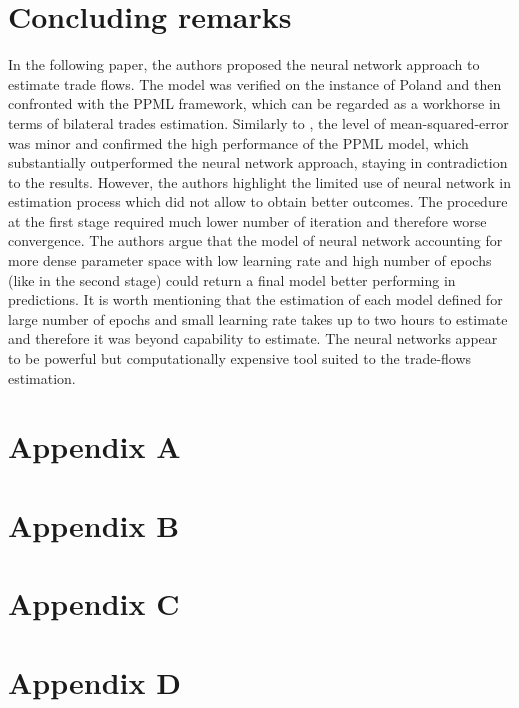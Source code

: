 \documentclass{Trade_template}
\numberwithin{equation}{section}
\begin{document}
\chapter{Concluding remarks} \label{Concluding remarks}
 
In the following paper, the authors proposed the neural network approach to estimate trade flows. The model was verified on the instance of Poland and then confronted with the PPML framework, which can be regarded as a workhorse in terms of bilateral trades estimation. Similarly to \citet{wohl2018}, the level of mean-squared-error was minor and confirmed the high performance of the PPML model, which substantially outperformed the neural network approach, staying in contradiction to the \citet{wohl2018} results. However, the authors highlight the limited use of neural network in estimation process which did not allow to obtain better outcomes. The procedure at the first stage required much lower number of iteration and therefore worse convergence. The authors argue that the model of neural network accounting for more dense parameter space with low learning rate and high number of epochs (like in the second stage) could return a final model better performing in predictions. It is worth mentioning that the estimation of each model defined for large number of epochs and small learning rate takes up to two hours to estimate and therefore it was beyond capability to estimate. The neural networks appear to be powerful but computationally expensive tool suited to the trade-flows estimation.

\newpage

\nocite{*}


\newpage

\chapter*{Appendix A} \label{Appendix A}



\chapter*{Appendix B} \label{Appendix B}



\newpage

\chapter*{Appendix C} \label{Appendix C}



\newpage

\chapter*{Appendix D} \label{Appendix D}


\end{document}
